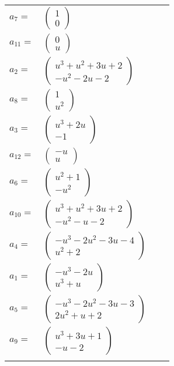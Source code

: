 \documentclass[1p]{elsarticle_modified}
\theoremstyle{definition}
\begin{document}
\begin{tabular}{m{7pt} m{180pt} m{7pt} m{180pt} }
\flushright $a_{7}=$&$\begin{pmatrix}1\\0\end{pmatrix}$ \\
\flushright $a_{11}=$&$\begin{pmatrix}0\\u\end{pmatrix}$ \\
\flushright $a_{2}=$&$\begin{pmatrix}u^3+u^2+3 u+2\\- u^2-2 u-2\end{pmatrix}$ \\
\flushright $a_{8}=$&$\begin{pmatrix}1\\u^2\end{pmatrix}$ \\
\flushright $a_{3}=$&$\begin{pmatrix}u^3+2 u\\-1\end{pmatrix}$ \\
\flushright $a_{12}=$&$\begin{pmatrix}- u\\u\end{pmatrix}$ \\
\flushright $a_{6}=$&$\begin{pmatrix}u^2+1\\- u^2\end{pmatrix}$ \\
\flushright $a_{10}=$&$\begin{pmatrix}u^3+u^2+3 u+2\\- u^2- u-2\end{pmatrix}$ \\
\flushright $a_{4}=$&$\begin{pmatrix}- u^3-2 u^2-3 u-4\\u^2+2\end{pmatrix}$ \\
\flushright $a_{1}=$&$\begin{pmatrix}- u^3-2 u\\u^3+u\end{pmatrix}$ \\
\flushright $a_{5}=$&$\begin{pmatrix}- u^3-2 u^2-3 u-3\\2 u^2+u+2\end{pmatrix}$ \\
\flushright $a_{9}=$&$\begin{pmatrix}u^3+3 u+1\\- u-2\end{pmatrix}$\\&\end{tabular}
\end{document}
